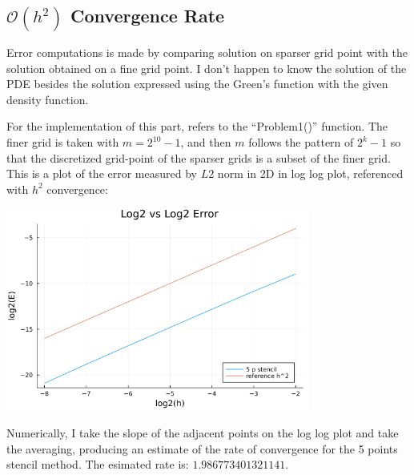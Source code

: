\documentclass[]{article}
\begin{document}
    \subsection*{$\mathcal{O}(h^2)$ Convergence Rate}
        \hspace{1.1em}
        Error computations is made by comparing solution on sparser grid point with the solution obtained on a fine grid point. I don't happen to know the solution of the PDE besides the solution expressed using the Green's function with the given density function.
        \par
        For the implementation of this part, refers to the ``Problem1()'' function. The finer grid is taken with $m = 2^{10} - 1$, and then $m$ follows the pattern of $2^{k} - 1$ so that the discretized grid-point of the sparser grids is a subset of the finer grid. This is a plot of the error measured by $L2$ norm in 2D in log log plot, referenced with $h^2$ convergence: 
        \begin{center}
            \includegraphics[width=10cm]{p1_fig.png}
        \end{center}
        Numerically, I take the slope of the adjacent points on the log log plot and take the averaging, producing an estimate of the rate of convergence for the 5 points stencil method. The esimated rate is: $1.986773401321141$. 
\end{document}
